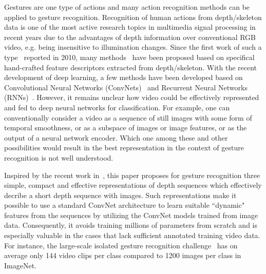 \documentclass[10pt, a4paper, conference]{IEEEtran}
\begin{document}
Gestures are one type of actions and many action recognition methods can be applied to gesture recognition. Recognition of human actions from depth/skeleton data is one of the most active research topics in multimedia signal processing in recent years due to the advantages of depth information over conventional RGB video, e.g. being insensitive to illumination changes. Since the first work of such a type~\cite{li2010action} reported in 2010, many methods~\cite{wang2012mining,Yang2012a,Oreifej2013,Gowayyed2013_HOD,yangsuper,rahmani2014hopc,
pichao2014,lurange,escalante2015principal,Vemulapallia2016,zhang2016rgb} have been proposed based on specifical hand-crafted feature descriptors extracted from depth/skeleton. With the recent development of deep learning, a few methods have been developed based on Convolutional Neural Networks (ConvNets)~\cite{pichao2015,pichaoTHMS,pichao2016,pichaoicprwa,pichaocsvt2016} and Recurrent Neural Networks (RNNs)~\cite{du2015hierarchical,veeriah2015differential,zhu2015co,shahroudy2016ntu}.  However, it remains unclear how video could be effectively represented and fed to deep neural networks for classification. For example, one can conventionally consider a video as a sequence of still images with some form of temporal smoothness, or as a subspace of images or image features, or as the output of a neural network encoder. Which one among these and other possibilities would result in the best representation in the context of gesture recognition is not well understood.


Inspired by the recent work in~\cite{pichao2015,pichaoTHMS,pichao2016,bilen2016dynamic}, this paper proposes for gesture recognition three simple, compact and effective representations of depth sequences which effectively decribe a short depth sequence with images. Such representations make it possible to use a standard ConvNet architecture to learn suitable ``dynamic" features from the sequences by utilizing the ConvNet models trained from image data. Consequently, it avoids training millions of parameters from scratch and is especially valuable in the cases that lack sufficient annotated training video data. For instance, the large-scale isolated gesture recognition challenge~\cite{wanchalearn} has on average only 144 video clips per class compared to 1200 images per class in ImageNet.
\end{document}
